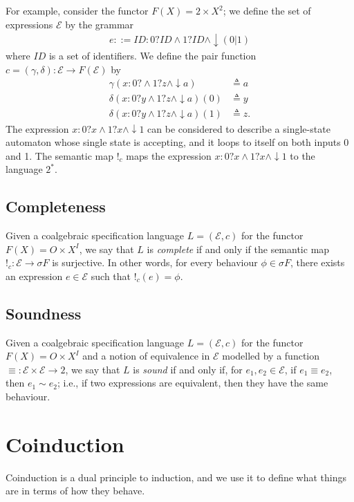 For example, consider the functor $F(X)=2\times X^2$; we define the set of expressions $\mathcal{E}$ by the grammar
\begin{align}
    e::= ID:0?ID\land1?ID\land\downarrow (0|1)
\end{align}
where $ID$ is a set of identifiers. We define the pair function $c=(\gamma,\delta)\colon \mathcal{E}\rightarrow F(\mathcal{E})$ by 
\begin{align*}
    \gamma(x:0?\land1?z\land\downarrow a)&\triangleq a\\
    \delta(x:0?y\land1?z\land\downarrow a)(0)&\triangleq y\\
    \delta(x:0?y\land1?z\land\downarrow a)(1)&\triangleq z.
\end{align*}
The expression $x:0?x\land1?x\land\downarrow 1$ can be considered to describe a single-state automaton whose single state is  accepting, and it loops to itself on both inputs 0 and 1. The semantic map $!_c$ maps the expression $x:0?x\land1?x\land\downarrow 1$ to the language $2^*$.%

\subsection{Completeness}
Given a coalgebraic specification language $L=(\mathcal{E},c)$ for the functor $F(X)=O\times X^I$, we say that $L$ is \emph{complete} if and only if the semantic map $!_c\colon \mathcal{E}\rightarrow \sigma F$ is surjective. In other words, for every behaviour $\phi\in \sigma F$, there exists an expression $e\in \mathcal{E}$ such that $!_c(e)=\phi$.

\subsection{Soundness}
Given a coalgebraic specification language $L=(\mathcal{E},c)$ for the functor $F(X)=O\times X^I$ and a notion of equivalence in $\mathcal{E}$ modelled by a function $\equiv \colon \mathcal{E}\times \mathcal{E}\rightarrow 2$, we say that $L$ is \emph{sound} if and only if, for $e_1, e_2\in \mathcal{E}$, if $e_1\equiv e_2$, then $e_1\sim e_2$; i.e., if two expressions are equivalent, then they have the same behaviour.

\section{Coinduction}
Coinduction is a dual principle to induction, and we use it to define what things are in terms of how they behave. 

